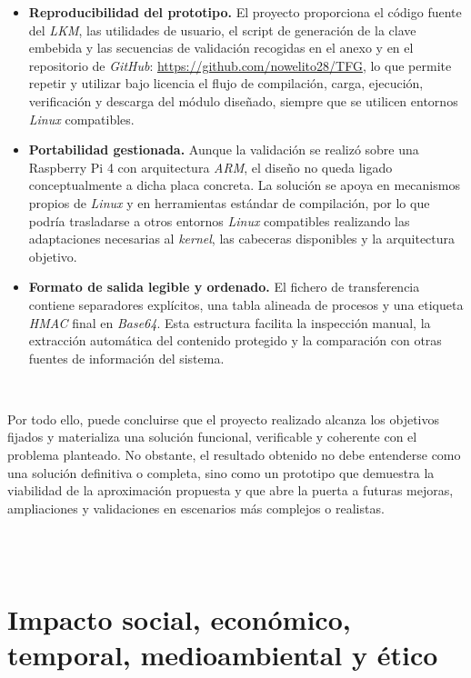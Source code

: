 \begin{itemize}
    \item \textbf{Reproducibilidad del prototipo.} El proyecto proporciona el código fuente del \textit{LKM}, las utilidades de usuario, el script de generación de la clave embebida y las secuencias de validación recogidas en el anexo y en el repositorio de \textit{GitHub}: \url{https://github.com/nowelito28/TFG}, lo que permite repetir y utilizar bajo licencia el flujo de compilación, carga, ejecución, verificación y descarga del módulo diseñado, siempre que se utilicen entornos \textit{Linux} compatibles.
    
    \item \textbf{Portabilidad gestionada.} Aunque la validación se realizó sobre una Raspberry Pi 4 con arquitectura \textit{ARM}, el diseño no queda ligado conceptualmente a dicha placa concreta. La solución se apoya en mecanismos propios de \textit{Linux} y en herramientas estándar de compilación, por lo que podría trasladarse a otros entornos \textit{Linux} compatibles realizando las adaptaciones necesarias al \textit{kernel}, las cabeceras disponibles y la arquitectura objetivo.
    
    \item \textbf{Formato de salida legible y ordenado.} El fichero de transferencia contiene separadores explícitos, una tabla alineada de procesos y una etiqueta \textit{HMAC} final en \textit{Base64}. Esta estructura facilita la inspección manual, la extracción automática del contenido protegido y la comparación con otras fuentes de información del sistema.
\end{itemize}

\

Por todo ello, puede concluirse que el proyecto realizado alcanza los objetivos fijados y materializa una solución funcional, verificable y coherente con el problema planteado.
No obstante, el resultado obtenido no debe entenderse como una solución definitiva o completa, sino como un prototipo que demuestra la viabilidad de la aproximación propuesta y que abre la puerta a futuras mejoras, ampliaciones y validaciones en escenarios más complejos o realistas.\\

\

\

\section{Impacto social, económico, temporal, medioambiental y ético}

